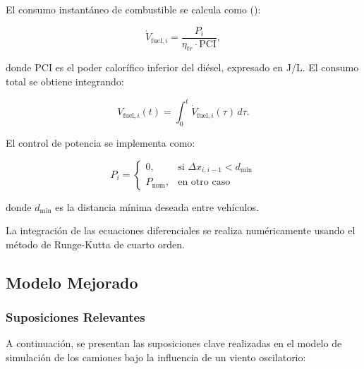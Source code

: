 \documentclass[11pt,stdletter,orderfromtodate,sigleft,twoside]{report}
\begin{document}
El consumo instantáneo de combustible se calcula como (\cite{combustionEngine}): 

\begin{equation}
    \dot{V}_{\text{fuel},i} = \frac{P_i}{\eta_{tr} \cdot \text{PCI}},
\end{equation}

donde $\text{PCI}$ es el poder calorífico inferior del diésel, expresado en J/L. El consumo total se obtiene integrando:

\begin{equation}
    V_{\text{fuel},i}(t) = \int_0^t \dot{V}_{\text{fuel},i}(\tau) \, d\tau.
\end{equation}

El control de potencia se implementa como:

\begin{equation}
    P_i =
    \begin{cases}
        0, & \text{si } \Delta x_{i,i-1} < d_{\text{min}} \\
        P_{\text{nom}}, & \text{en otro caso}
    \end{cases}
\end{equation}

donde $d_{\text{min}}$ es la distancia mínima deseada entre vehículos.

La integración de las ecuaciones diferenciales se realiza numéricamente usando el método de Runge-Kutta de cuarto orden.

\subsection{Modelo Mejorado}


\subsubsection{Suposiciones Relevantes}

A continuación, se presentan las suposiciones clave realizadas en el modelo de simulación de los camiones bajo la influencia de un viento oscilatorio:
\end{document}
